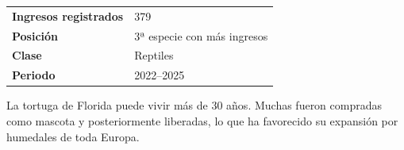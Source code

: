 \documentclass[11pt,a4paper]{article}
\begin{document}
\vspace{0.45cm}


\begin{tcolorbox}[
colback=Beige,
colframe=ForestGreen,
title=\faChartBar\ Resultados del análisis,
fonttitle=\bfseries]

\begin{tabular}{ll}

\textbf{Ingresos registrados} & 379 \\

\textbf{Posición} & 3ª especie con más ingresos \\

\textbf{Clase} & Reptiles \\

\textbf{Periodo} & 2022--2025 \\

\end{tabular}

\end{tcolorbox}

\vspace{0.25cm}


\begin{tcolorbox}[
colback=Stone,
colframe=SoftGreen,
title=\faLightbulb\ ¿Sabías que...?,
fonttitle=\bfseries]

La tortuga de Florida puede vivir más de 30 años.
Muchas fueron compradas como mascota y posteriormente
liberadas, lo que ha favorecido su expansión por
humedales de toda Europa.

\end{tcolorbox}

\vspace{0.25cm}


\begin{flushright}


\end{flushright}
\end{document}

